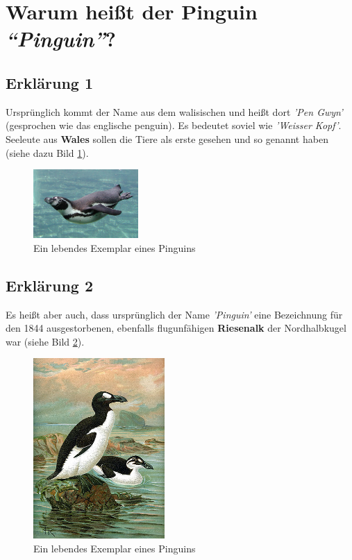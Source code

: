 \documentclass[a4paper, pdftex, ngerman, 11pt]{article}
\begin{document}
\section{Warum heißt der Pinguin \emph{"`Pinguin"'}?}
\subsection{Erklärung 1}
Ursprünglich kommt der Name aus dem walisischen und heißt dort \emph{'Pen Gwyn'} (gesprochen wie das englische penguin). Es bedeutet soviel wie \emph{'Weisser Kopf'}. Seeleute aus \textbf{Wales} sollen die Tiere als erste gesehen und so genannt haben (siehe dazu Bild \ref{img:pen}).

\begin{figure}[H]
	\begin{center}
		\includegraphics[width=4cm]{bilder/swim-Ping.jpg}
		\caption{Ein lebendes Exemplar eines Pinguins}
		\label{img:pen}
	\end{center}
\end{figure}

\subsection{Erklärung 2}
Es heißt aber auch, dass ursprünglich der Name \emph{'Pinguin'} eine Bezeichnung für den 1844 ausgestorbenen, ebenfalls flugunfähigen \textbf{Riesenalk} der Nordhalbkugel war (siehe Bild \ref{img:auk}).

\begin{figure}[H]
\begin{center}
\includegraphics[width=5cm]{bilder/GreatAuk.jpg}
\caption{Ein lebendes Exemplar eines Pinguins}
\label{img:auk}
\end{center}
\end{figure}
\end{document}
